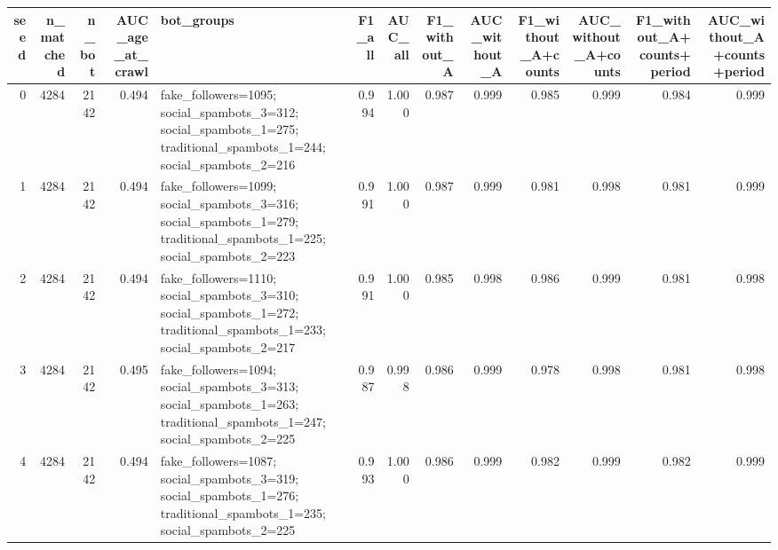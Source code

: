 \begin{tabular}{rrrrlrrrrrrrr}
\toprule
seed & n_matched & n_bot & AUC_age_at_crawl & bot_groups & F1_all & AUC_all & F1_without_A & AUC_without_A & F1_without_A+counts & AUC_without_A+counts & F1_without_A+counts+period & AUC_without_A+counts+period \\
\midrule
0 & 4284 & 2142 & 0.494 & fake_followers=1095; social_spambots_3=312; social_spambots_1=275; traditional_spambots_1=244; social_spambots_2=216 & 0.994 & 1.000 & 0.987 & 0.999 & 0.985 & 0.999 & 0.984 & 0.999 \\
1 & 4284 & 2142 & 0.494 & fake_followers=1099; social_spambots_3=316; social_spambots_1=279; traditional_spambots_1=225; social_spambots_2=223 & 0.991 & 1.000 & 0.987 & 0.999 & 0.981 & 0.998 & 0.981 & 0.999 \\
2 & 4284 & 2142 & 0.494 & fake_followers=1110; social_spambots_3=310; social_spambots_1=272; traditional_spambots_1=233; social_spambots_2=217 & 0.991 & 1.000 & 0.985 & 0.998 & 0.986 & 0.999 & 0.981 & 0.998 \\
3 & 4284 & 2142 & 0.495 & fake_followers=1094; social_spambots_3=313; social_spambots_1=263; traditional_spambots_1=247; social_spambots_2=225 & 0.987 & 0.998 & 0.986 & 0.999 & 0.978 & 0.998 & 0.981 & 0.998 \\
4 & 4284 & 2142 & 0.494 & fake_followers=1087; social_spambots_3=319; social_spambots_1=276; traditional_spambots_1=235; social_spambots_2=225 & 0.993 & 1.000 & 0.986 & 0.999 & 0.982 & 0.999 & 0.982 & 0.999 \\
\bottomrule
\end{tabular}
